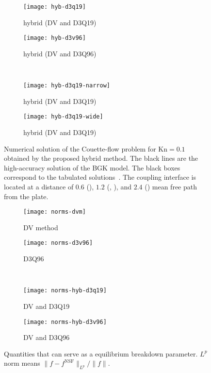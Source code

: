 \documentclass[]{elsarticle} %
\newcommand{\Kn}{\mathrm{Kn}}
\begin{document}
{\begin{figure}
    \centering
    \begin{subfigure}[b]{0.5\textwidth}
        \texttt{[image: hyb-d3q19]}
        \caption{hybrid (DV and D3Q19)}
        \label{fig:hyb:d3q19}
    \end{subfigure}%
    \begin{subfigure}[b]{0.5\textwidth}
        \texttt{[image: hyb-d3v96]}
        \caption{hybrid (DV and D3Q96)}
        \label{fig:hyb:d3q96}
    \end{subfigure}\\
    \begin{subfigure}[b]{0.5\textwidth}
        \texttt{[image: hyb-d3q19-narrow]}
        \caption{hybrid (DV and D3Q19)}
        \label{fig:hyb:d3q19-narrow}
    \end{subfigure}%
    \begin{subfigure}[b]{0.5\textwidth}
        \texttt{[image: hyb-d3q19-wide]}
        \caption{hybrid (DV and D3Q19)}
        \label{fig:hyb:d3q19-wide}
    \end{subfigure}
    \caption{
        Numerical solution of the Couette-flow problem for $\Kn=0.1$ obtained by the proposed hybrid method.
        The black lines are the high-accuracy solution of the BGK model.
        The black boxes correspond to the tabulated solutions~\cite{Luo2015, Luo2016}.
        The coupling interface is located at a distance of $0.6$ (),
        $1.2$ (, ),
        and $2.4$ () mean free path from the plate.
    }\label{fig:hybrid}
\end{figure}

\begin{figure}
    \centering
    \begin{subfigure}[b]{0.5\textwidth}
        \texttt{[image: norms-dvm]}
        \caption{DV method}
        \label{fig:norms:dvm}
    \end{subfigure}%
    \begin{subfigure}[b]{0.5\textwidth}
        \texttt{[image: norms-d3v96]}
        \caption{D3Q96}
        \label{fig:norms:d3q96}
    \end{subfigure}\\
    \begin{subfigure}[b]{0.5\textwidth}
        \texttt{[image: norms-hyb-d3q19]}
        \caption{DV and D3Q19}
        \label{fig:norms:d3q19-hyb}
    \end{subfigure}%
    \begin{subfigure}[b]{0.5\textwidth}
        \texttt{[image: norms-hyb-d3v96]}
        \caption{DV and D3Q96}
        \label{fig:norms:d3q96-hyb}
    \end{subfigure}
    \caption{
        Quantities that can serve as a equilibrium breakdown parameter. \(L^p\) norm means \(\|f-f^{\mathrm{NSF}}\|_{L^p}/\|f\|\).
    }\label{fig:norms}
\end{figure}

}
\end{document}
